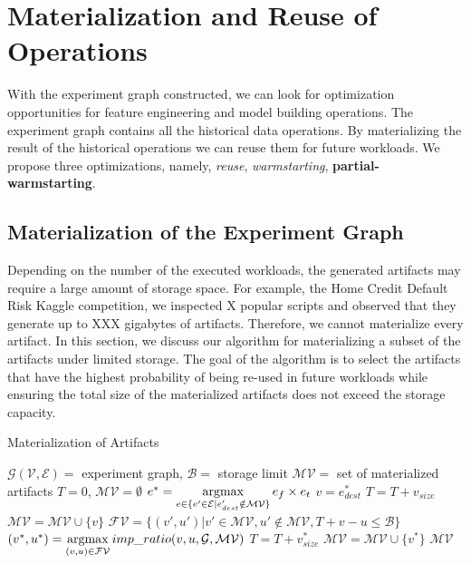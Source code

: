 \section{Materialization and Reuse of Operations}\label{sec-materializaiton-and-reuse}
With the experiment graph constructed, we can look for optimization opportunities for feature engineering and model building operations.
The experiment graph contains all the historical data operations.
By materializing the result of the historical operations we can reuse them for future workloads.
We propose three optimizations, namely, \textit{reuse}, \textit{warmstarting}, \textbf{partial-warmstarting}.

\subsection{Materialization of the Experiment Graph}
Depending on the number of the executed workloads, the generated artifacts may require a large amount of storage space.
For example, the Home Credit Default Risk Kaggle competition, we inspected X popular scripts and observed that they generate up to XXX gigabytes of artifacts. 
Therefore, we cannot materialize every artifact.
In this section, we discuss our algorithm for materializing a subset of the artifacts under limited storage.
The goal of the algorithm is to select the artifacts that have the highest probability of being re-used in future workloads while ensuring the total size of the materialized artifacts does not exceed the storage capacity.

\begin{algorithm}
\caption{Materialization of Artifacts}\label{materialization-algorithm}
\begin{algorithmic}[1]
\Require  $\mathcal{G(V,E)}=$ experiment graph, $\mathcal{B}=$ storage limit
\Ensure $\mathcal{MV}=$ set of materialized artifacts
\State $T=0$, $\mathcal{MV} =\emptyset$
	\State $e^* = \operatorname*{argmax}\limits_{e \in \{e' \in \mathcal{E} \lvert e'_{dest} \notin \mathcal{MV}\}} e_f \times e_t$
	\State $v = e^{*}_{dest}$
			\State $T = T + v_{size}$
			\State $\mathcal{MV} = \mathcal{MV} \cup \{v\}$
		\EndIf
\EndWhile
\Do
	\State $\mathcal{FV} = \{(v',u') \lvert v' \in \mathcal{MV}, u' \notin \mathcal{MV}, T + v - u \leq \mathcal{B} \}$
	\State $(v^*,u^*) =  \operatorname*{argmax}\limits_{(v,u) \in \mathcal{FV}}  imp\_ratio(v,u, \mathcal{G}, \mathcal{MV})$
	\State $T = T + v^{*}_{size}$
	\State $\mathcal{MV} = \mathcal{MV} \cup \{v^*\}$
\State \Return $\mathcal{MV}$
\end{algorithmic}
\end{algorithm}

